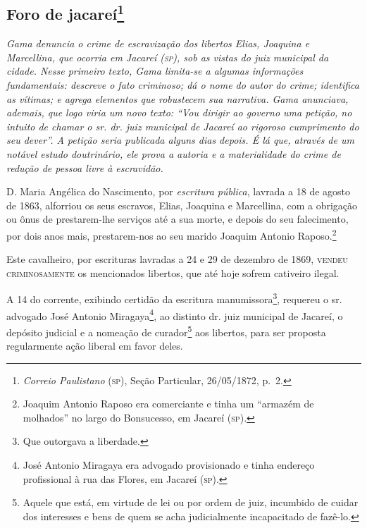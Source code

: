 {\begin{flushright}
\chapter{Foro de jacareí\footnote{\emph{Correio Paulistano} (\textsc{sp}), Seção Particular,
  26/05/1872, p.~2.}} %

\begin{didascalia}
\emph{Gama denuncia o crime de escravização dos libertos Elias, Joaquina
e Marcellina, que ocorria em Jacareí (\textsc{sp}), sob as vistas do juiz
municipal da cidade. Nesse primeiro texto, Gama limita-se a algumas
informações fundamentais: descreve o fato criminoso; dá o nome do autor
do crime; identifica as vítimas; e agrega elementos que robustecem sua
narrativa. Gama anunciava, ademais, que logo viria um novo texto: ``Vou
dirigir ao governo uma petição, no intuito de chamar o sr. dr. juiz
municipal de Jacareí ao rigoroso cumprimento do seu dever''. A petição
seria publicada alguns dias depois. É lá que, através de um notável
estudo doutrinário, ele prova a autoria e a materialidade do crime de
redução de pessoa livre à escravidão.}
\end{didascalia}

D. Maria Angélica do Nascimento, por \emph{escritura pública}, lavrada a
18 de agosto de 1863, alforriou os seus escravos, Elias, Joaquina e
Marcellina, com a obrigação ou ônus de prestarem-lhe serviços até a sua
morte, e depois do seu falecimento, por dois anos mais, prestarem-nos ao
seu marido Joaquim Antonio Raposo.\footnote{ Joaquim Antonio Raposo era
  comerciante e tinha um ``armazém de molhados'' no largo do Bonsucesso,
  em Jacareí (\textsc{sp}).}

Este cavalheiro, por escrituras lavradas a 24 e 29 de dezembro de 1869,
\textsc{vendeu} \textsc{criminosamente} os mencionados libertos, que até hoje sofrem
cativeiro ilegal.

A 14 do corrente, exibindo certidão da escritura manumissora\footnote{
  Que outorgava a liberdade.}, requereu o sr. advogado José Antonio
Miragaya\footnote{ José Antonio Miragaya era advogado provisionado e
  tinha endereço profissional à rua das Flores, em Jacareí (\textsc{sp}).}, ao
distinto dr. juiz municipal de Jacareí, o depósito judicial e a nomeação
de curador\footnote{ Aquele que está, em virtude de lei ou por ordem de
  juiz, incumbido de cuidar dos interesses e bens de quem se acha
  judicialmente incapacitado de fazê-lo.} aos libertos, para ser
proposta regularmente ação liberal em favor deles.


\end{flushright}}
